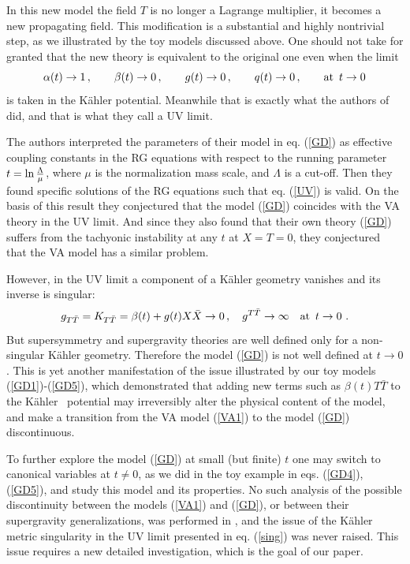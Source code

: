 \documentclass[11pt]{article}
\newcommand{\be}{\begin{equation}}
\newcommand{\ee}{\end{equation}}
\def\K{K{\"a}hler }
\newcommand{\rf}[1]{(\ref{#1})}
\def\be{\begin{equation}}
\def\ee{\end{equation}}
\begin{document}
In this new model the field $T$ is no longer a Lagrange multiplier, it becomes a new propagating field. This modification is a   substantial and highly nontrivial step, as we illustrated by the toy models discussed above. One should not take for granted that the new theory is equivalent to the original one even when the limit  
\be
 \alpha(t) \to 1\, , \qquad \beta(t) \to 0   \, , \qquad g(t) \to 0  \,   , \qquad q(t) \to 0\,  , \qquad  {\rm at } \, \, \, t  \to 0
\label{UV}
\ee
 is taken  in the \K potential.  Meanwhile that is exactly what the authors of \cite{DallAgata:2022abm} did,  and that is what they call a UV limit. 
 
The authors interpreted the parameters of their model in eq. \rf{GD} as  effective coupling constants in the RG equations with respect to the running parameter $t = \ln {\Lambda\over \mu}$, where $\mu$ is the normalization mass scale, and $\Lambda$ is  a cut-off. Then they found  specific solutions of  the RG equations such that  eq. \rf{UV} is valid. On the basis of this result  they conjectured that the model \rf{GD}  coincides  with the VA theory in the UV limit. And since they also found that their own theory \rf{GD} suffers from the tachyonic instability at any $t$ at $X=T=0$, they  conjectured that the VA  model has a similar problem.

However, in the UV limit  a component of a  \K geometry vanishes  and its inverse is singular:
\be  
 g_{T\bar T}=K_{T\bar T} = \beta(t) + g(t) X\bar X\to 0\, ,  \quad g^{T\bar T}\to \infty  \quad  {\rm at } \, \, \, t  \to 0 \ .
\label{sing}\ee
But supersymmetry and supergravity theories are well defined only for a non-singular \K geometry. Therefore the model \rf{GD} is not well defined at $t \to 0$. This is yet another manifestation of the issue illustrated by our toy models  \rf{GD1}-\rf{GD5}, which demonstrated that adding new terms such as   $\beta(t)  T  {\bar T}$ to the \K\ potential may  irreversibly alter the physical content of the model, and make a transition from the VA model \rf{VA1} to the model \rf{GD} discontinuous. 

To further explore the model \rf{GD} at small (but finite) $t$  one may  switch to canonical variables at $t\neq 0$, as we did in the toy example in eqs. \rf{GD4}, \rf{GD5}, and study this model and  its properties. No such analysis of the possible discontinuity between the models \rf{VA1} and \rf{GD}, or between their supergravity generalizations,  was performed in   \cite{DallAgata:2022abm}, and the issue of the \K metric singularity in the UV limit presented  in eq. \rf{sing} was never raised. This issue requires a new detailed investigation, which is the goal of our paper. 
\end{document}
